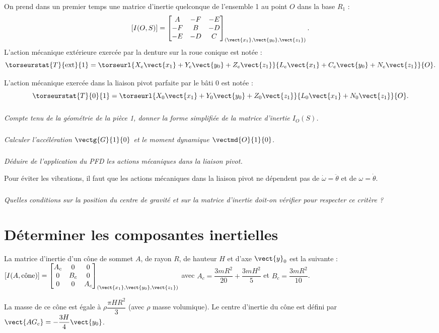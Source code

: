 \begin{multicols}{2}
On prend dans un premier temps une matrice d'inertie quelconque de l'ensemble 1 au point $O$ dans la base $R_1$ : $$\left[I(O,S)\right]=
\begin{bmatrix}
A & -F & -E \\ 
-F & B & -D \\ 
-E & -D & C
\end{bmatrix}_{(\vect{x_1},\vect{y_0},\vect{z_1})}.$$
L'action mécanique extérieure exercée par la denture sur la roue conique est notée : $$\torseurstat{T}{\text{ext}}{1}=\torseurl{X_e \vect{x_1}+Y_e \vect{y_0}+ Z_e \vect{z_1}}{L_e \vect{x_1}+C_e \vect{y_0}+N_e \vect{z_1}}{O}.$$

L'action mécanique exercée dans la liaison pivot parfaite par le bâti 0 est notée : $$\torseurstat{T}{0}{1}=\torseurl{X_0 \vect{x_1}+Y_0 \vect{y_0}+ Z_0 \vect{z_1}}{L_0 \vect{x_1}+ N_0\vect{z_1}}{O}.$$

\subparagraph{}
\textit{Compte tenu de la géométrie de la pièce 1, donner la forme simplifiée de la matrice d'inertie $I_O(S)$.}


\subparagraph{}
\textit{Calculer l'accélération $\vectg{G}{1}{0}$ et le moment dynamique $\vectmd{O}{1}{0}$.}


\subparagraph{}
\textit{Déduire de l'application du PFD les actions mécaniques dans la liaison pivot.}

Pour éviter les vibrations, il faut que les actions mécaniques dans la liaison pivot ne dépendent pas de $\dot{\omega}=\ddot{\theta}$ et de $\omega=\dot{\theta}$.

\subparagraph{}
\textit{Quelles conditions sur la position du centre de gravité et sur la matrice d'inertie doit-on vérifier pour respecter ce critère ?}


\section*{Déterminer les composantes inertielles}

La matrice d'inertie d'un cône de sommet $A$, de rayon $R$, de hauteur $H$ et d'axe $\vect{y}_0$ est la suivante : $\left[I(A,\text{cône})\right]=
\begin{bmatrix}
A_c & 0 & 0 \\ 
0 & B_c & 0 \\ 
0 & 0 & A_c
\end{bmatrix}_{(\vect{x_1},\vect{y_0},\vect{z_1})}
$
avec $A_c=\dfrac{3 m R^2}{20}+\dfrac{3mH^2}{5}$ et $B_c=\dfrac{3mR^2}{10}$.

La masse de ce cône est égale à $\rho \dfrac{\pi H R^2}{3}$ (avec $\rho$ masse volumique). Le centre d'inertie du cône est défini par $\vect{AG_c}=-\dfrac{3 H}{4} \vect{y_0}$.



\end{multicols}
